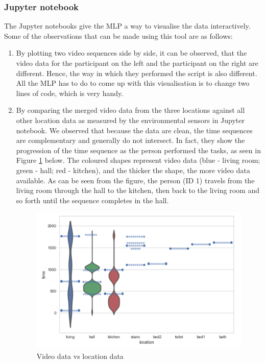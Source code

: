 \documentclass[fleqn,10pt]{SelfArx} %
\begin{document}
\subsubsection{Jupyter notebook}
The Jupyter notebooks give the MLP a way to visualise the data interactively. Some of the observations that can be made using this tool are as follows:
\begin{enumerate}
\item By plotting two video sequences side by side, it can be observed, that the video data for the participant on the left and the participant on the right are different. Hence, the way in which they performed the script is also different. All the MLP has to do to come up with this visualisation is to change two lines of code, which is very handy. 
\item By comparing the merged video data from the three locations against all other location data as measured by the environmental sensors in Jupyter notebook. We observed that because the data are clean, the time sequences are complementary and generally do not intersect. In fact, they show the progression of the time sequence as the person performed the tasks, as seen in Figure \ref{fig:vidnloc} below. The coloured shapes represent video data (blue - living room; green - hall; red - kitchen), and the thicker the shape, the more video data available. As can be seen from the figure, the person (ID 1) travels from the living room through the hall to the kitchen, then back to the living room and so forth until the sequence completes in the hall.  \\
 
\begin{figure}[!h] \centering
	\includegraphics[scale=0.5]{vidnloc} 
	\caption{Video data vs location data}
	\label{fig:vidnloc}
\end{figure}

\end{enumerate}
\end{document}
